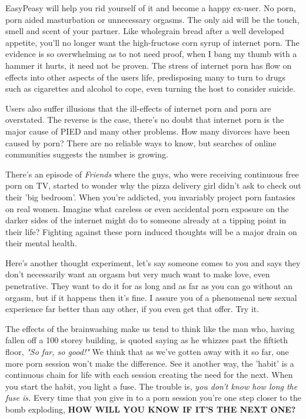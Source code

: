 \documentclass[easypeasy.tex]{subfiles}
\begin{document}
EasyPeasy will help you rid yourself of it and become a happy ex-user. No porn, porn aided masturbation or unnecessary orgasms. The only aid will be the touch, smell and scent of your partner. Like wholegrain bread after a well developed appetite, you'll no longer want the high-fructose corn syrup of internet porn. The evidence is so overwhelming as to not need proof, when I bang my thumb with a hammer it hurts, it need not be proven. The stress of internet porn has flow on effects into other aspects of the users life, predisposing many to turn to drugs such as cigarettes and alcohol to cope, even turning the host to consider suicide.

Users also suffer illusions that the ill-effects of internet porn and porn are overstated. The reverse is the case, there's no doubt that internet porn is the major cause of PIED and many other problems. How many divorces have been caused by porn? There are no reliable ways to know, but searches of online communities suggests the number is growing.

There's an episode of \textit{Friends} where the guys, who were receiving continuous free porn on TV, started to wonder why the pizza delivery girl didn't ask to check out their 'big bedroom'. When you're addicted, you invariably project porn fantasies on real women. Imagine what careless or even accidental porn exposure on the darker sides of the internet might do to someone already at a tipping point in their life? Fighting against these porn induced thoughts will be a major drain on their mental health.

Here's another thought experiment, let's say someone comes to you and says they don't necessarily want an orgasm but very much want to make love, even penetrative. They want to do it for as long and as far as you can go without an orgasm, but if it happens then it's fine. I assure you of a phenomenal new sexual experience far better than any other, if you even get that offer. Try it.

The effects of the brainwashing make us tend to think like the man who, having fallen off a 100 storey building, is quoted saying as he whizzes past the fiftieth floor, \textit{"So far, so good!"} We think that as we've gotten away with it so far, one more porn session won't make the difference. See it another way, the 'habit' is a continuous chain for life with each session creating the need for the next. When you start the habit, you light a fuse. The trouble is, \textit{you don't know how long the fuse is.} Every time that you give in to a porn session you're one step closer to the bomb exploding, \textbf{HOW WILL YOU KNOW IF IT'S THE NEXT ONE?}
\end{document}
